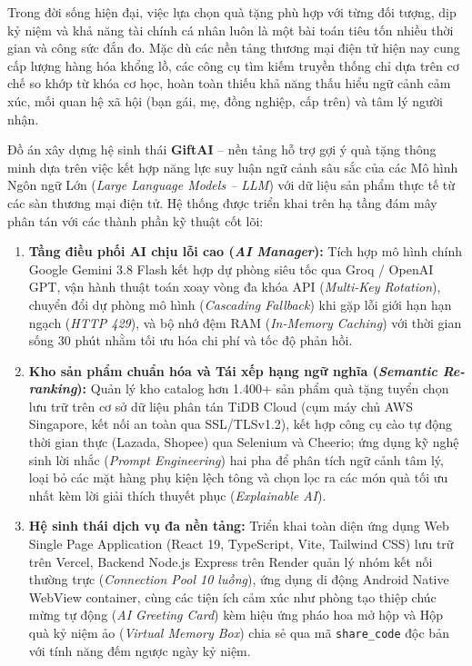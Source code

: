 Trong đời sống hiện đại, việc lựa chọn quà tặng phù hợp với từng đối tượng, dịp kỷ niệm và khả năng tài chính cá nhân luôn là một bài toán tiêu tốn nhiều thời gian và công sức đắn đo. Mặc dù các nền tảng thương mại điện tử hiện nay cung cấp lượng hàng hóa khổng lồ, các công cụ tìm kiếm truyền thống chỉ dựa trên cơ chế so khớp từ khóa cơ học, hoàn toàn thiếu khả năng thấu hiểu ngữ cảnh cảm xúc, mối quan hệ xã hội (bạn gái, mẹ, đồng nghiệp, cấp trên) và tâm lý người nhận.

Đồ án xây dựng hệ sinh thái \textbf{GiftAI} -- nền tảng hỗ trợ gợi ý quà tặng thông minh dựa trên việc kết hợp năng lực suy luận ngữ cảnh sâu sắc của các Mô hình Ngôn ngữ Lớn (\textit{Large Language Models -- LLM}) với dữ liệu sản phẩm thực tế từ các sàn thương mại điện tử. Hệ thống được triển khai trên hạ tầng đám mây phân tán với các thành phần kỹ thuật cốt lõi:
\begin{enumerate}[leftmargin=1.2cm, itemsep=2pt]
    \item \textbf{Tầng điều phối AI chịu lỗi cao (\textit{AI Manager}):} Tích hợp mô hình chính Google Gemini 3.8 Flash kết hợp dự phòng siêu tốc qua Groq / OpenAI GPT, vận hành thuật toán xoay vòng đa khóa API (\textit{Multi-Key Rotation}), chuyển đổi dự phòng mô hình (\textit{Cascading Fallback}) khi gặp lỗi giới hạn hạn ngạch (\textit{HTTP 429}), và bộ nhớ đệm RAM (\textit{In-Memory Caching}) với thời gian sống 30 phút nhằm tối ưu hóa chi phí và tốc độ phản hồi.
    \item \textbf{Kho sản phẩm chuẩn hóa và Tái xếp hạng ngữ nghĩa (\textit{Semantic Re-ranking}):} Quản lý kho catalog hơn 1.400+ sản phẩm quà tặng tuyển chọn lưu trữ trên cơ sở dữ liệu phân tán TiDB Cloud (cụm máy chủ AWS Singapore, kết nối an toàn qua SSL/TLSv1.2), kết hợp công cụ cào tự động thời gian thực (Lazada, Shopee) qua Selenium và Cheerio; ứng dụng kỹ nghệ sinh lời nhắc (\textit{Prompt Engineering}) hai pha để phân tích ngữ cảnh tâm lý, loại bỏ các mặt hàng phụ kiện lệch tông và chọn lọc ra các món quà tối ưu nhất kèm lời giải thích thuyết phục (\textit{Explainable AI}).
    \item \textbf{Hệ sinh thái dịch vụ đa nền tảng:} Triển khai toàn diện ứng dụng Web Single Page Application (React 19, TypeScript, Vite, Tailwind CSS) lưu trữ trên Vercel, Backend Node.js Express trên Render quản lý nhóm kết nối thường trực (\textit{Connection Pool 10 luồng}), ứng dụng di động Android Native WebView container, cùng các tiện ích cảm xúc như phòng tạo thiệp chúc mừng tự động (\textit{AI Greeting Card}) kèm hiệu ứng pháo hoa mở hộp và Hộp quà kỷ niệm ảo (\textit{Virtual Memory Box}) chia sẻ qua mã \texttt{share\_code} độc bản với tính năng đếm ngược ngày kỷ niệm.
\end{enumerate}

